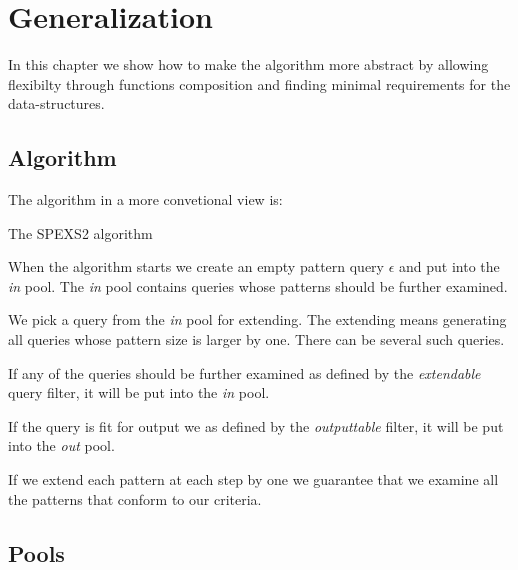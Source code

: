 \chapter{Generalization}

In this chapter we show how to make the algorithm more 
abstract by allowing flexibilty through functions composition and
finding minimal requirements for the data-structures.

\section{Algorithm}

The algorithm in a more convetional view is:

\begin{algorithm}[H]
	\caption{The SPEXS2 algorithm}
\begin{algorithmic}[1]
			\EndIf
			\EndIf
		\EndFor
	\EndWhile
\end{algorithmic}
\end{algorithm}

When the algorithm starts we create an empty pattern query $\epsilon$ and put 
into the \emph{in} pool. The \emph{in} pool contains queries whose patterns
should be further examined.

We pick a query from the \emph{in} pool for extending. The extending means
generating all queries whose pattern size is larger by one. There can be
several such queries.

If any of the queries should be further examined as defined by the
\emph{extendable} query filter, it will be put into the \emph{in} pool.

If the query is fit for output we as defined by the \emph{outputtable} filter,
it will be put into the \emph{out} pool.

If we extend each pattern at each step by one we guarantee that we
examine all the patterns that conform to our criteria.

\section{Pools}

